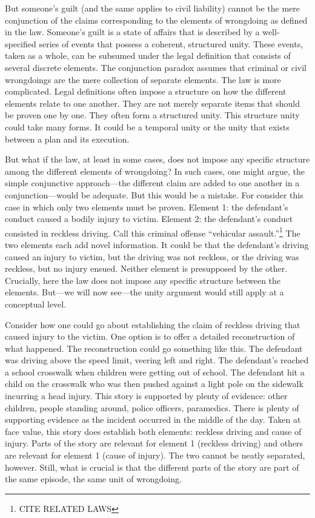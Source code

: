\documentclass[
  10pt,
  dvipsnames,enabledeprecatedfontcommands]{scrartcl}
\begin{document}
But someone's guilt (and the same applies to civil liability) cannot be
the mere conjunction of the claims corresponding to the elements of
wrongdoing as defined in the law. Someone's guilt is a state of affairs
that is described by a well-specified series of events that possess a
coherent, structured unity. These events, taken as a whole, can be
subsumed under the legal definition that consists of several discrete
elements. The conjunction paradox assumes that criminal or civil
wrongdoings are the mere collection of separate elements. The law is
more complicated. Legal definitions often impose a structure on how the
different elements relate to one another. They are not merely separate
items that should be proven one by one. They often form a structured
unity. This structure unity could take many forms. It could be a
temporal unity or the unity that exists between a plan and its
execution.

But what if the law, at least in some cases, does not impose any
specific structure among the different elements of wrongdoing? In such
cases, one might argue, the simple conjunctive approach---the different
claim are added to one another in a conjunction---would be adequate. But
this would be a mistake. For consider this case in which only two
elements must be proven. Element 1: the defendant's conduct caused a
bodily injury to victim. Element 2: the defendant's conduct consisted in
reckless driving. Call this criminal offense ``vehicular
assault.''\footnote{CITE RELATED LAWS} The two elements each add novel
information. It could be that the defendant's driving caused an injury
to victim, but the driving was not reckless, or the driving was
reckless, but no injury ensued. Neither element is presupposed by the
other. Crucially, here the law does not impose any specific structure
between the elements. But---we will now see---the unity argument would
still apply at a conceptual level.

Consider how one could go about establishing the claim of reckless
driving that caused injury to the victim. One option is to offer a
detailed reconstruction of what happened. The reconstruction could go
something like this. The defendant was driving above the speed limit,
veering left and right. The defendant's reached a school crosswalk when
children were getting out of school. The defendant hit a child on the
crosswalk who was then pushed against a light pole on the sidewalk
incurring a head injury. This story is supported by plenty of evidence:
other children, people standing around, police officers, paramedics.
There is plenty of supporting evidence as the incident occurred in the
middle of the day. Taken at face value, this story does establish both
elements: reckless driving and cause of injury. Parts of the story are
relevant for element 1 (reckless driving) and others are relevant for
element 1 (cause of injury). The two cannot be neatly separated,
however. Still, what is crucial is that the different parts of the story
are part of the same episode, the same unit of wrongdoing.
\end{document}

